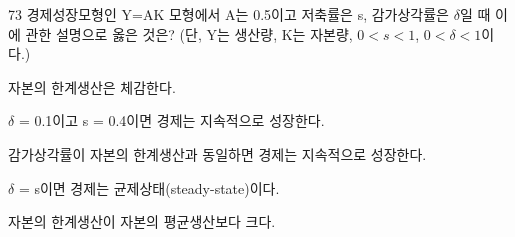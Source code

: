 \begin{question}{73}
경제성장모형인 Y=AK 모형에서 A는 0.5이고 저축률은 s, 감가상각률은 $\delta$일 때 이에 관한 설명으로 옳은 것은? (단, Y는 생산량, K는 자본량, $0<s<1$, $0<\delta<1$이다.)
\begin{choices}
  \item 자본의 한계생산은 체감한다.
  \item $\delta$ = 0.1이고 s = 0.4이면 경제는 지속적으로 성장한다.
  \item 감가상각률이 자본의 한계생산과 동일하면 경제는 지속적으로 성장한다.
  \item $\delta$ = s이면 경제는 균제상태(steady-state)이다.
  \item 자본의 한계생산이 자본의 평균생산보다 크다.
\end{choices}
\end{question}
